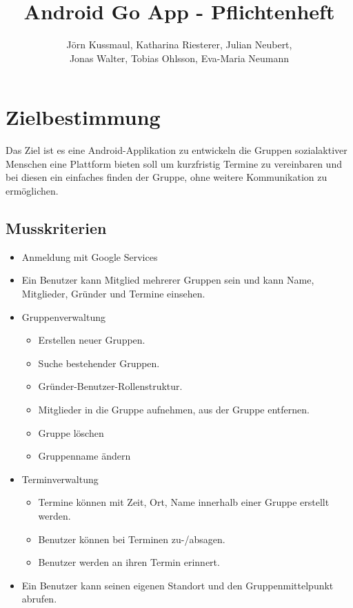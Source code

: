 \documentclass{scrartcl}
\title{Android Go App - Pflichtenheft}
\author{Jörn Kussmaul, Katharina Riesterer, Julian Neubert,\\ Jonas Walter, Tobias Ohlsson, Eva-Maria Neumann}
\begin{document}
		
	

	\maketitle
	\newpage
	
	\tableofcontents
	\newpage
	\section{Zielbestimmung}
	Das Ziel ist es eine Android-Applikation zu entwickeln die Gruppen sozialaktiver Menschen eine Plattform bieten soll um kurzfristig Termine zu vereinbaren und bei diesen ein einfaches finden der Gruppe, ohne weitere Kommunikation zu ermöglichen.
	\subsection{Musskriterien}
	\begin{itemize}
		\item Anmeldung mit Google Services
		\item Ein Benutzer kann \gls{Mitglied} mehrerer Gruppen sein und kann Name, Mitglieder, Gründer und Termine einsehen.
		\item Gruppenverwaltung
		\begin{itemize}
			\item Erstellen neuer Gruppen.
			\item Suche bestehender Gruppen.
			\item Gründer-Benutzer-Rollenstruktur.
			\item Mitglieder in die Gruppe aufnehmen, aus der Gruppe entfernen.
			\item Gruppe löschen
			\item Gruppenname ändern
		\end{itemize}
		\item Terminverwaltung
		\begin{itemize}
			\item Termine können mit Zeit, Ort, Name innerhalb einer Gruppe erstellt werden.
			\item Benutzer können bei Terminen zu-/absagen.
			\item Benutzer werden an ihren Termin erinnert.
		\end{itemize}
		\item Ein Benutzer kann seinen eigenen Standort und den Gruppenmittelpunkt abrufen.	
	\end{itemize}
\end{document}
